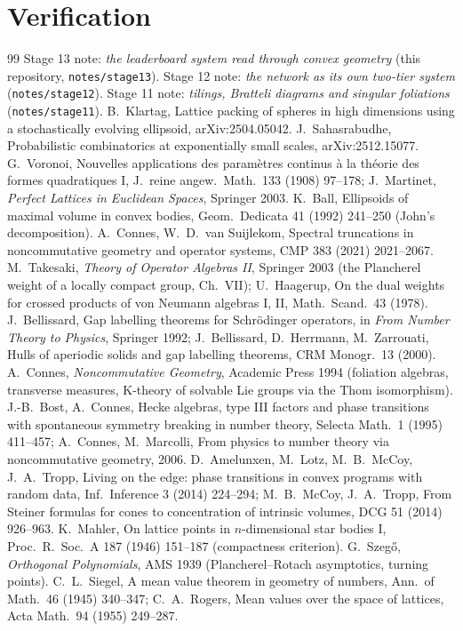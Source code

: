 \documentclass[11pt]{article}
\theoremstyle{plain}
\theoremstyle{definition}\newtheorem{definition}[theorem]{Definition}\newtheorem{remark}[theorem]{Remark}
\begin{document}
\section*{Verification}

\begin{thebibliography}{99}\small
{} Stage 13 note: \emph{the leaderboard system read through convex geometry} (this repository, \texttt{notes/stage13}).
 Stage 12 note: \emph{the network as its own two-tier system} (\texttt{notes/stage12}).
 Stage 11 note: \emph{tilings, Bratteli diagrams and singular foliations} (\texttt{notes/stage11}).
 B.~Klartag, Lattice packing of spheres in high dimensions using a stochastically evolving ellipsoid, arXiv:2504.05042.
 J.~Sahasrabudhe, Probabilistic combinatorics at exponentially small scales, arXiv:2512.15077.
 G.~Voronoi, Nouvelles applications des param\`etres continus \`a la th\'eorie des formes quadratiques I, J.~reine angew.~Math.~133 (1908) 97--178; J.~Martinet, \emph{Perfect Lattices in Euclidean Spaces}, Springer 2003.
 K.~Ball, Ellipsoids of maximal volume in convex bodies, Geom.~Dedicata 41 (1992) 241--250 (John's decomposition).
 A.~Connes, W.~D.~van Suijlekom, Spectral truncations in noncommutative geometry and operator systems, CMP 383 (2021) 2021--2067.
 M.~Takesaki, \emph{Theory of Operator Algebras II}, Springer 2003 (the Plancherel weight of a locally compact group, Ch.~VII); U.~Haagerup, On the dual weights for crossed products of von Neumann algebras I, II, Math.~Scand.~43 (1978).
 J.~Bellissard, Gap labelling theorems for Schr\"odinger operators, in \emph{From Number Theory to Physics}, Springer 1992; J.~Bellissard, D.~Herrmann, M.~Zarrouati, Hulls of aperiodic solids and gap labelling theorems, CRM Monogr.~13 (2000).
 A.~Connes, \emph{Noncommutative Geometry}, Academic Press 1994 (foliation algebras, transverse measures, K-theory of solvable Lie groups via the Thom isomorphism).
 J.-B.~Bost, A.~Connes, Hecke algebras, type III factors and phase transitions with spontaneous symmetry breaking in number theory, Selecta Math.~1 (1995) 411--457; A.~Connes, M.~Marcolli, From physics to number theory via noncommutative geometry, 2006.
 D.~Amelunxen, M.~Lotz, M.~B.~McCoy, J.~A.~Tropp, Living on the edge: phase transitions in convex programs with random data, Inf.~Inference 3 (2014) 224--294; M.~B.~McCoy, J.~A.~Tropp, From Steiner formulas for cones to concentration of intrinsic volumes, DCG 51 (2014) 926--963.
 K.~Mahler, On lattice points in $n$-dimensional star bodies I, Proc.~R.~Soc.~A 187 (1946) 151--187 (compactness criterion).
 G.~Szeg\H{o}, \emph{Orthogonal Polynomials}, AMS 1939 (Plancherel--Rotach asymptotics, turning points).
 C.~L.~Siegel, A mean value theorem in geometry of numbers, Ann.~of Math.~46 (1945) 340--347; C.~A.~Rogers, Mean values over the space of lattices, Acta Math.~94 (1955) 249--287.
\end{thebibliography}
\end{document}
